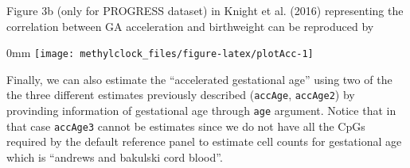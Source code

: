 \documentclass[]{article}
\newcommand{\hlstr}[1]{\textcolor[rgb]{0.251,0.627,0.251}{#1}}%
\newcommand{\hlopt}[1]{\textcolor[rgb]{0,0,0}{#1}}%
\newcommand{\hlstd}[1]{\textcolor[rgb]{0.251,0.251,0.251}{#1}}%
\newcommand{\hlkwc}[1]{\textcolor[rgb]{0.251,0.251,0.251}{#1}}%
\newcommand{\hlkwd}[1]{\textcolor[rgb]{0.878,0.439,0.125}{#1}}%
\newenvironment{Shaded}{\begin{myshaded}}{\end{myshaded}}
\newcommand{\KeywordTok}[1]{\hlkwd{#1}}
\newcommand{\DataTypeTok}[1]{\hlkwc{#1}}
\newcommand{\StringTok}[1]{\hlstr{#1}}
\newcommand{\OtherTok}[1]{{#1}}
\newcommand{\OperatorTok}[1]{\hlopt{#1}}
\newcommand{\NormalTok}[1]{\hlstd{#1}}
\begin{document}
Figure 3b (only for PROGRESS dataset) in Knight et al. (2016) representing the correlation between GA acceleration and birthweight can be reproduced by

\begin{Shaded}
\end{Shaded}

\begin{adjustwidth}{\fltoffset}{0mm}
\texttt{[image: methylclock\_files/figure-latex/plotAcc-1]} \end{adjustwidth}

Finally, we can also estimate the ``accelerated gestational age'' using two of the the three different estimates previously described (\texttt{accAge}, \texttt{accAge2}) by provinding information of gestational age through \texttt{age} argument. Notice that in that case \texttt{accAge3} cannot be estimates since we do not have all the CpGs required by the default reference panel to estimate cell counts for gestational age which is ``andrews and bakulski cord blood''.
\end{document}
